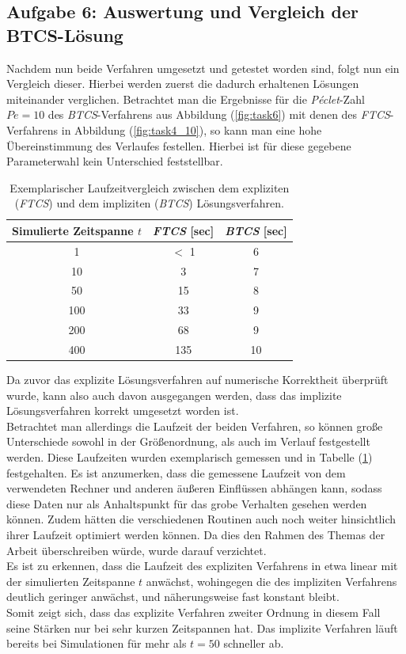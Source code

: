 \documentclass[12pt,a4paper,titlepage,headinclude,bibtotoc]{scrartcl}
\begin{document}
\subsection{Aufgabe 6: Auswertung und Vergleich der BTCS-Lösung}
\label{sec:disc_speed_comparison}
Nachdem nun beide Verfahren umgesetzt und getestet worden sind, folgt nun ein Vergleich dieser. Hierbei werden zuerst die dadurch erhaltenen Lösungen miteinander verglichen. Betrachtet man die Ergebnisse für die \textit{Péclet}-Zahl $Pe = 10$ des \textit{BTCS}-Verfahrens aus Abbildung (\ref{fig:task6}) mit denen des \textit{FTCS}-Verfahrens in Abbildung (\ref{fig:task4_10}), so kann man eine hohe Übereinstimmung des Verlaufes festellen. Hierbei ist für diese gegebene Parameterwahl kein Unterschied feststellbar.
\begin{table}[H]
	\centering
	\begin{tabular}{c|c|c}
		Simulierte Zeitspanne $t$ & \textit{FTCS} [sec] & \textit{BTCS} [sec] \\ 
		\hline  \hline 
		1 & $<$ 1 & 6 \\ 
		\hline 
		10 & 3 & 7 \\ 
		\hline 
		50 & 15 & 8 \\ 
		\hline 
		100 & 33 & 9 \\ 
		\hline 
		200 & 68 & 9 \\ 
		\hline 
		400 & 135 & 10 \\ 
		\hline 
	\end{tabular}
	\label{table:speed_comparison} 
	\caption{Exemplarischer Laufzeitvergleich zwischen dem expliziten (\textit{FTCS}) und dem impliziten (\textit{BTCS}) Lösungsverfahren.}
\end{table}
Da zuvor das explizite Lösungsverfahren auf numerische Korrektheit überprüft wurde, kann also auch davon ausgegangen werden, dass das implizite Lösungsverfahren korrekt umgesetzt worden ist.\\
Betrachtet man allerdings die Laufzeit der beiden Verfahren, so können große Unterschiede sowohl in der Größenordnung, als auch im Verlauf festgestellt werden. Diese Laufzeiten wurden exemplarisch gemessen und in Tabelle (\ref{table:speed_comparison}) festgehalten. Es ist anzumerken, dass die gemessene Laufzeit von dem verwendeten Rechner und anderen äußeren Einflüssen abhängen kann, sodass diese Daten nur als Anhaltspunkt für das grobe Verhalten gesehen werden können. Zudem hätten die verschiedenen Routinen auch noch weiter hinsichtlich ihrer Laufzeit optimiert werden können. Da dies den Rahmen des Themas der Arbeit überschreiben würde, wurde darauf verzichtet.\\
Es ist zu erkennen, dass die Laufzeit des expliziten Verfahrens in etwa linear mit der simulierten Zeitspanne $t$ anwächst, wohingegen die des impliziten Verfahrens deutlich geringer anwächst, und näherungsweise fast konstant bleibt.\\
Somit zeigt sich, dass das explizite Verfahren zweiter Ordnung in diesem Fall seine Stärken nur bei sehr kurzen Zeitspannen hat. Das implizite Verfahren läuft bereits bei Simulationen für mehr als $t=50$ schneller ab.
\end{document}
